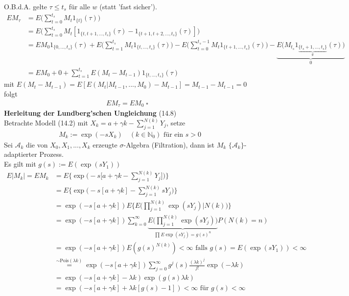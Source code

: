 \documentclass[a4paper,openany]{book}
\theoremstyle{mytheoremstyle}
\theoremstyle{mytheoremstyle2}
\newtheorem*{cbew}{Beweis}
\newenvironment{bew}[1][]{%
  \ifthenelse{\boolean{showbew}}{%
    \begin{cbew}[#1]%
  }{%
    \expandafter\comment%
  }%
}{%
  \ifthenelse{\boolean{showbew}}{%
    \end{cbew}%
  }{%
    \expandafter\endcomment%
  }%
}
\begin{document}
\begin{bew}[]
  O.B.d.A. gelte $\tau \leq t_s$ für alle $w$ (statt 'fast sicher'). \\
  \begin{align*}
    E M _{\tau}
    &=E \bigg(\sum_{t=0}^{t_s}{M_t 1_{\{t\}}}(\tau)\bigg)\\
    &=E \bigg(\sum_{t=0}^{t_s}{M_t [1_{\{t,t+1,...,t_s\}}(\tau)-1_{\{t+1,t+2,...,t_s\}}(\tau)]}\bigg)\\
    &=EM_0 1_{\{0,...,t_s\}}(\tau)+E \bigg(\sum_{t=1}^{t_s}{M_t 1_{\{t,...,t_s\}}(\tau)}\bigg)-E \bigg(\sum_{t=0}^{t_s-1}{M_t 1_{\{t+1,...,t_s\}}(\tau)}\bigg)-\underbrace{E \bigg(M _{t_s}1_{\underbrace{\{t_s+1,...,t_s\}}_{\emptyset }}(\tau)\bigg)}_{0}\\
    &=E M_0+0+\sum_{t=1}^{t_s}{E(M_t-M _{t-1})1_{\{t,...,t_s\}}(\tau)}
  \end{align*}
  mit $E(M_t-M _{t-1})=E[E(M_t|M _{t-1},...,M_0)-M _{t-1}]=M _{t-1}-M _{t-1}=0$
  folgt 
  \begin{align*}
    E M _{\tau}=E M_0\;\square
  \end{align*}
\end{bew}
\noindent\textbf{Herleitung der Lundberg'schen Ungleichung} (14.8)\\
Betrachte Modell (14.2) mit $X_k=a+\gamma k-\sum_{j=1}^{N(k)}{Y_j} $, setze
\begin{align*}
  &M_k:=\exp(-sX_k)\quad(k \in \mathbb{N}_0)\text{ für ein }s>0 
\end{align*}
Sei $\mathcal{A}_k$ die von $X_0,X_1,...,X_k$ erzeugte $\sigma $-Algebra (Filtration), dann ist $M_k$ $\{\mathcal{A}_k\}$-adaptierter Prozess.\\
Es gilt mit $g(s):=E(\exp(sY_1)) $
\begin{align*}
  E|M_k|=EM_k
  &=E\bigg\{\exp\bigg(-s\bigg[a+\gamma k-\sum_{j=1}^{N(k)}{Y_j}\bigg]\bigg)\bigg\}\\
  &=E\bigg\{\exp\bigg(-s[a+\gamma k]-\sum_{j=1}^{N(k)}{sY_j}\bigg)\bigg\}\\
  &=\exp(-s[a+\gamma k]){E\bigg\{E\bigg(\prod_{j=1}^{N(k)}{\exp(sY_j)}\bigg|N(k)\bigg)\bigg\}}\\
  &=\exp(-s[a+\gamma k])\sum_{k=0}^{\infty }{}\underbrace{E\bigg(\prod_{j=1}^{N(k)}{\exp(sY_j)}\bigg)}_{\prod_{}^{}{E\exp(sY_j)}=g(s)^n}P(N(k)=n)\\
  &=\exp(-s[a+\gamma k])  E(g(s)^{N(k)})<\infty \text{ falls }g(s)=E(\exp(sY_1))<\infty \\
  &\!\!\!\!\!\!\!\!\overset{\sim \text{Pois}(\lambda k)}=\exp(-s[a+\gamma k])\sum_{j=0}^{\infty }{g^j(s)\frac{(\lambda k)^j}{j!}\exp(-\lambda k)}\\
  &=\exp(-s[a+\gamma k]-\lambda k)\exp(g(s)\lambda k)\\
  &=\exp(-s[a+\gamma k]+\lambda k[g(s)-1])<\infty \text{ für }g(s)<\infty 
\end{align*}
\end{document}
